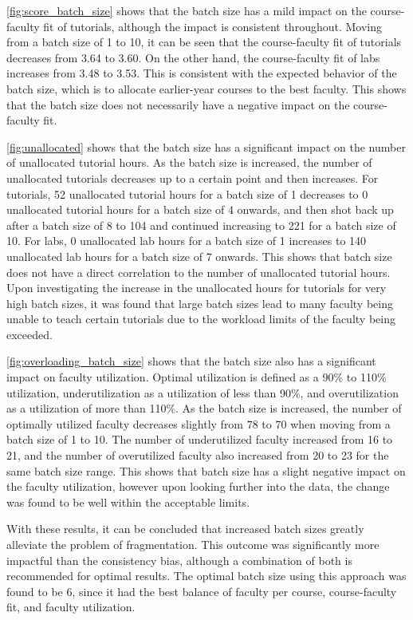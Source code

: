 \autoref{fig:score_batch_size} shows that the batch size has a mild impact on the course-faculty fit of tutorials, although the impact is consistent throughout. Moving from a batch size of 1 to 10, it can be seen that the course-faculty fit of tutorials decreases from 3.64 to 3.60. On the other hand, the course-faculty fit of labs increases from 3.48 to 3.53. This is consistent with the expected behavior of the batch size, which is to allocate earlier-year courses to the best faculty. This shows that the batch size does not necessarily have a negative impact on the course-faculty fit.

\autoref{fig:unallocated} shows that the batch size has a significant impact on the number of unallocated tutorial hours. As the batch size is increased, the number of unallocated tutorials decreases up to a certain point and then increases. For tutorials, 52 unallocated tutorial hours for a batch size of 1 decreases to 0 unallocated tutorial hours for a batch size of 4 onwards, and then shot back up after a batch size of 8 to 104 and continued increasing to 221 for a batch size of 10. For labs, 0 unallocated lab hours for a batch size of 1 increases to 140 unallocated lab hours for a batch size of 7 onwards. This shows that batch size does not have a direct correlation to the number of unallocated tutorial hours. Upon investigating the increase in the unallocated hours for tutorials for very high batch sizes, it was found that large batch sizes lead to many faculty being unable to teach certain tutorials due to the workload limits of the faculty being exceeded.

\autoref{fig:overloading_batch_size} shows that the batch size also has a significant impact on faculty utilization. Optimal utilization is defined as a 90\% to 110\% utilization, underutilization as a utilization of less than 90\%, and overutilization as a utilization of more than 110\%. As the batch size is increased, the number of optimally utilized faculty decreases slightly from 78 to 70 when moving from a batch size of 1 to 10. The number of underutilized faculty increased from 16 to 21, and the number of overutilized faculty also increased from 20 to 23 for the same batch size range. This shows that batch size has a slight negative impact on the faculty utilization, however upon looking further into the data, the change was found to be well within the acceptable limits.

With these results, it can be concluded that increased batch sizes greatly alleviate the problem of fragmentation. This outcome was significantly more impactful than the consistency bias, although a combination of both is recommended for optimal results. The optimal batch size using this approach was found to be 6, since it had the best balance of faculty per course, course-faculty fit, and faculty utilization.


